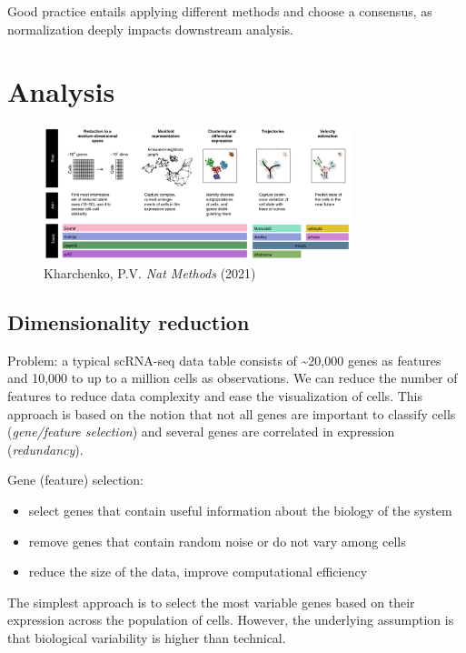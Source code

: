 Good practice entails applying different methods and choose a consensus,
as normalization deeply impacts downstream analysis.

\hypertarget{analysis}{%
\section{Analysis}\label{analysis}}

\begin{figure}
\centering
\includegraphics[width=0.8\textwidth]{images/Screenshot-3.png}
\caption{Kharchenko, P.V. \emph{Nat Methods} (2021)}
\end{figure}

\hypertarget{dimensionality-reduction}{%
\subsection{Dimensionality reduction}\label{dimensionality-reduction}}

Problem: a typical scRNA-seq data table consists of
\textasciitilde20,000 genes as features and 10,000 to up to a million
cells as observations. We can reduce the number of features to reduce
data complexity and ease the visualization of cells. This approach is
based on the notion that not all genes are important to classify cells
(\emph{gene/feature selection}) and several genes are correlated in
expression (\emph{redundancy}).

Gene (feature) selection:

\begin{itemize}
\tightlist
\item
  select genes that contain useful information about the biology of the
  system
\item
  remove genes that contain random noise or do not vary among cells
\item
  reduce the size of the data, improve computational efficiency
\end{itemize}

The simplest approach is to select the most variable genes based on
their expression across the population of cells. However, the underlying
assumption is that biological variability is higher than technical.


